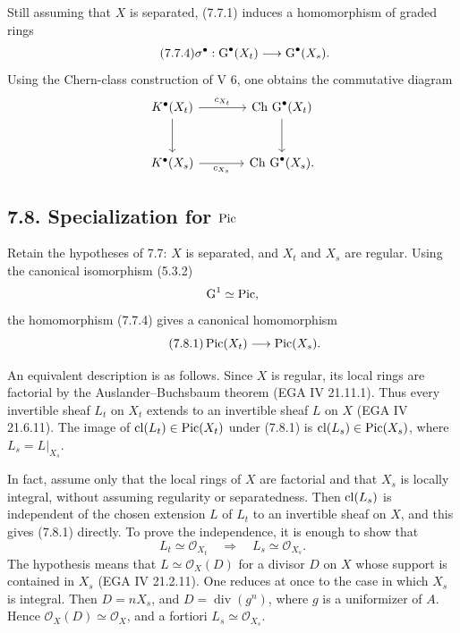 Still assuming that $X$ is separated, (7.7.1) induces a homomorphism of
graded rings
\begin{equation}\tag{7.7.4}
\sigma^\bullet:\operatorname{G}^\bullet(X_t)\longrightarrow\operatorname{G}^\bullet(X_s).
\end{equation}
Using the Chern-class construction of V 6, one obtains the commutative
diagram
\[
\begin{tikzcd}[column sep=large,row sep=large]
K^\bullet(X_t) \arrow[r,"c_{X_t}"] \arrow[d] &
\Ch\,\Gr^\bullet(X_t) \arrow[d]\\
K^\bullet(X_s) \arrow[r,"c_{X_s}"'] &
\Ch\,\Gr^\bullet(X_s).
\end{tikzcd}
\]

\subsection*{7.8. Specialization for $\operatorname{Pic}$}
Retain the hypotheses of 7.7: $X$ is separated, and $X_t$ and $X_s$ are
regular. Using the canonical isomorphism (5.3.2)
\[
\operatorname{G}^1\simeq\operatorname{Pic},
\]
the homomorphism (7.7.4) gives a canonical homomorphism
\begin{equation}\tag{7.8.1}
\operatorname{Pic}(X_t)\longrightarrow\operatorname{Pic}(X_s).
\end{equation}

An equivalent description is as follows. Since $X$ is regular, its local
rings are factorial by the Auslander--Buchsbaum theorem (EGA IV 21.11.1).
Thus every invertible sheaf $L_t$ on $X_t$ extends to an invertible sheaf
$L$ on $X$ (EGA IV 21.6.11). The image of
$\operatorname{cl}(L_t)\in\operatorname{Pic}(X_t)$ under (7.8.1) is
$\operatorname{cl}(L_s)\in\operatorname{Pic}(X_s)$, where $L_s=L|_{X_s}$.

In fact, assume only that the local rings of $X$ are factorial and that
$X_s$ is locally integral, without assuming regularity or separatedness.
Then $\operatorname{cl}(L_s)$ is independent of the chosen extension $L$ of $L_t$ to an
invertible sheaf on $X$, and this gives (7.8.1) directly. To prove the
independence, it is enough to show that
\[
L_t\simeq\mathcal O_{X_t}\quad\Longrightarrow\quad
L_s\simeq\mathcal O_{X_s}.
\]
The hypothesis means that $L\simeq\mathcal O_X(D)$ for a divisor $D$ on
$X$ whose support is contained in $X_s$ (EGA IV 21.2.11). One reduces at
once to the case in which $X_s$ is integral. Then $D=nX_s$, and
$D=\operatorname{div}(g^n)$, where $g$ is a uniformizer of $A$. Hence
$\mathcal O_X(D)\simeq\mathcal O_X$, and a fortiori
$L_s\simeq\mathcal O_{X_s}$.

